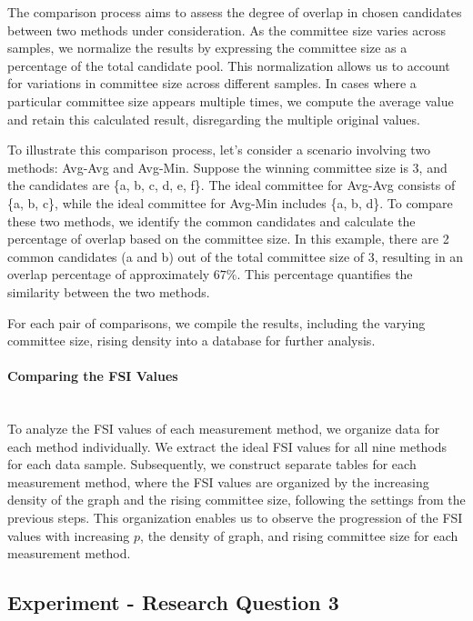 \documentclass{article}
\begin{document}
The comparison process aims to assess the degree of overlap in chosen candidates between two methods under consideration. As the committee size varies across samples, we normalize the results by expressing the committee size as a percentage of the total candidate pool. This normalization allows us to account for variations in committee size across different samples. In cases where a particular committee size appears multiple times, we compute the average value and retain this calculated result, disregarding the multiple original values.

To illustrate this comparison process, let's consider a scenario involving two methods: Avg-Avg and Avg-Min. Suppose the winning committee size is 3, and the candidates are \{a, b, c, d, e, f\}. The ideal committee for Avg-Avg consists of \{a, b, c\}, while the ideal committee for Avg-Min includes \{a, b, d\}. To compare these two methods, we identify the common candidates and calculate the percentage of overlap based on the committee size. In this example, there are 2 common candidates (a and b) out of the total committee size of 3, resulting in an overlap percentage of approximately $67\%$. This percentage quantifies the similarity between the two methods.

For each pair of comparisons, we compile the results, including the varying committee size, rising density into a database for further analysis.


\paragraph*{Comparing the FSI Values}\mbox{} \\
To analyze the FSI values of each measurement method, we organize data for each method individually. We extract the ideal FSI values for all nine methods for each data sample. Subsequently, we construct separate tables for each measurement method, where the FSI values are organized by the increasing density of the graph and the rising committee size, following the settings from the previous steps. This organization enables us to observe the progression of the FSI values with increasing $p$, the density of graph, and rising committee size for each measurement method.




\subsection{Experiment - Research Question 3}
\end{document}
